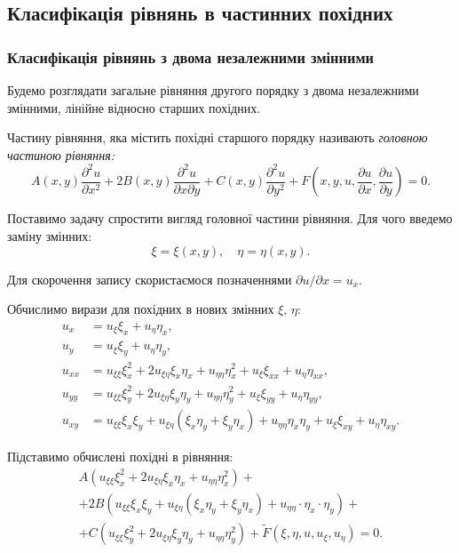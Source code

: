 \subsection{Класифікація рівнянь в частинних похідних}

\subsubsection{Класифікація рівнянь з двома незалежними змінними}

Будемо розглядати загальне рівняння другого порядку з двома незалежними змінними, лінійне відносно старших похідних.
\begin{definition}
	Частину рівняння, яка містить похідні старшого порядку називають \it{головною} частиною рівняння:
	\begin{equation}
		A(x,y)\dfrac{\partial^2u}{\partial x^2}+2B(x,y)\dfrac{\partial^2u}{\partial x\partial y}+C(x,y)\dfrac{\partial^2u}{\partial y^2}+F\left(x,y,u,\dfrac{\partial u}{\partial x},\dfrac{\partial u}{\partial y}\right)=0.
	\end{equation}
\end{definition}

Поставимо задачу спростити вигляд головної частини рівняння. Для чого введемо заміну змінних: 
\begin{equation}
	\xi = \xi(x, y), \quad \eta = \eta(x, y).
\end{equation}

Для скорочення запису скористаємося позначеннями  $\partial u / \partial x = u_x$. \medskip

Обчислимо вирази для похідних в нових змінних $\xi$, $\eta$:
\begin{align}
	u_x &= u_\xi \xi_x + u_\eta \eta_x, \\
	u_y &= u_\xi \xi_y + u_\eta \eta_y, \\
	u_{xx} &= u_{\xi\xi} \xi_x^2 + 2 u_{\xi\eta} \xi_x \eta_x + u_{\eta\eta} \eta_x^2 + u_\xi \xi_{xx} + u_\eta \eta_{xx}, \\
	u_{yy} &= u_{\xi\xi} \xi_y^2 + 2 u_{\xi\eta} \xi_y \eta_y + u_{\eta\eta} \eta_y^2 + u_\xi \xi_{yy} + u_\eta \eta_{yy}, \\
	u_{xy} &= u_{\xi\xi} \xi_x \xi_y + u_{\xi\eta} (\xi_x \eta_y + \xi_y \eta_x) + u_{\eta\eta} \eta_x \eta_y + u_\xi \xi_{xy} + u_\eta \eta_{xy}.
\end{align}

Підставимо обчислені похідні в рівняння:
\begin{multline}
	A (u_{\xi\xi} \xi_x^2 + 2 u_{\xi\eta} \xi_x \eta_x + u_{\eta\eta} \eta_x^2 ) + \\
	+ 2 B(u_{\xi\xi} \xi_x \xi_y + u_{\xi\eta}(\xi_x\eta_y+\xi_y\eta_x)+u_{\eta\eta}\cdot\eta_x\cdot\eta_y) + \\
	+ C (u_{\xi\xi} \xi_y^2 + 2 u_{\xi\eta}\xi_y\eta_y + u_{\eta\eta}\eta_y^2) + \widetilde{F}(\xi, \eta, u, u_\xi, u_\eta) = 0.
\end{multline}

